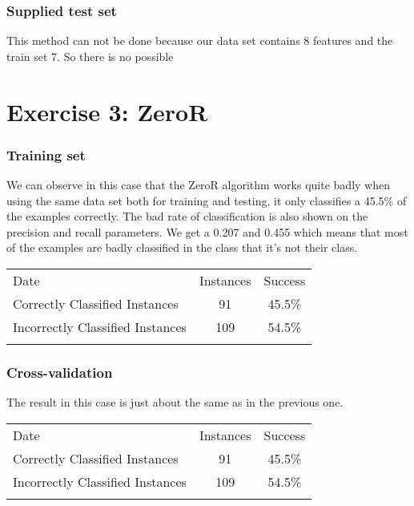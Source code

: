 \documentclass[]{article}
\begin{document}
\subsubsection{Supplied test set}\label{supplied-test-set-3}

This method can not be done because our data set contains 8 features and
the train set 7. So there is no possible

\section{Exercise 3: ZeroR}\label{exercise-3-zeror}

\subsubsection{Training set}\label{training-set-4}

We can observe in this case that the ZeroR algorithm works quite badly
when using the same data set both for training and testing, it only
classifies a 45.5\% of the examples correctly. The bad rate of
classification is also shown on the precision and recall parameters. We
get a 0.207 and 0.455 which means that most of the examples are badly
classified in the class that it's not their class.

\begin{longtable}[c]{@{}lcc@{}}
\toprule\addlinespace
Date & Instances & Success
\\\addlinespace
\midrule\endhead
Correctly Classified Instances & 91 & 45.5\%
\\\addlinespace
Incorrectly Classified Instances & 109 & 54.5\%
\\\addlinespace
\bottomrule
\end{longtable}

\subsubsection{Cross-validation}\label{cross-validation-3}

The result in this case is just about the same as in the previous one.

\begin{longtable}[c]{@{}lcc@{}}
\toprule\addlinespace
Date & Instances & Success
\\\addlinespace
\midrule\endhead
Correctly Classified Instances & 91 & 45.5\%
\\\addlinespace
Incorrectly Classified Instances & 109 & 54.5\%
\\\addlinespace
\bottomrule
\end{longtable}
\end{document}
